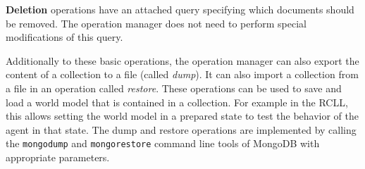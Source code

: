 \textbf{Deletion} operations have an attached query specifying which
documents should be removed. The operation manager does not need to
perform special modifications of this query.

Additionally to these basic operations, the operation manager can also
export the content of a collection to a file (called \emph{dump}). It
can also import a collection from a file in an operation called
\emph{restore}. These operations can be used to save and load a world
model that is contained in a collection. For example in the RCLL, this
allows setting the world model in a prepared state to test the
behavior of the agent in that state. The dump and restore operations
are implemented by calling the \texttt{mongodump} and
\texttt{mongorestore} command line tools of MongoDB with appropriate
parameters.

